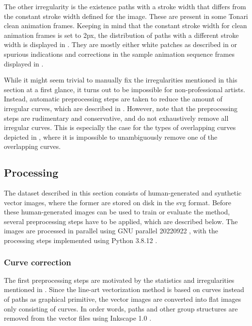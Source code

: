 The other irregularity is the existence paths with a stroke width that differs from the constant stroke width defined for the image. These are present in some Tonari clean animation frames. Keeping in mind that the constant stroke width for clean animation frames is set to 2px, the distribution of paths with a different stroke width is displayed in . They are mostly either white patches as described in  or spurious indications and corrections in the sample animation sequence frames displayed in .

While it might seem trivial to manually fix the irregularities mentioned in this section at a first glance, it turns out to be impossible for non-professional artists. Instead, automatic preprocessing steps are taken to reduce the amount of irregular curves, which are described in . However, note that the preprocessing steps are rudimentary and conservative, and do not exhaustively remove all irregular curves. This is especially the case for the types of overlapping curves depicted in , where it is impossible to unambiguously remove one of the overlapping curves.

\subsection{Processing}
\label{subsec:dataset.processing}

The dataset described in this section consists of human-generated and synthetic vector images, where the former are stored on disk in the \gls{svg} format. Before these human-generated images can be used to train or evaluate the method, several preprocessing steps have to be applied, which are described below. The images are processed in parallel using GNU parallel 20220922 \citep{tange_ole_2022_7105792}, with the processing steps implemented using Python 3.8.12 \citep{python}.

\subsubsection{Curve correction}
The first preprocessing steps are motivated by the statistics and irregularities mentioned in . Since the line-art vectorization method is based on curves instead of paths as graphical primitive, the vector images are converted into flat images only consisting of curves. In order words, paths and other group structures are removed from the vector files using  Inkscape 1.0 \citep{Inkscape}.

